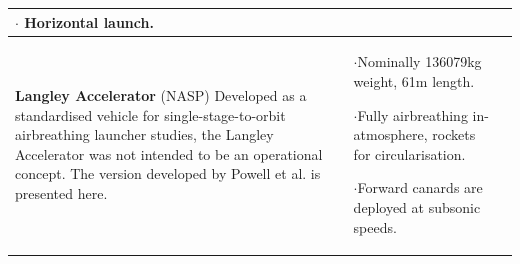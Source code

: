 \begin{xltabular}{\linewidth}{|X|X|X|}
$\cdot$ Horizontal launch.
\\
\hline\small \textbf{Langley Accelerator} (NASP)\cite{WCC,Powell1991,Lu1993} 
\newline  \newline Developed as a standardised vehicle for single-stage-to-orbit airbreathing launcher studies, the Langley Accelerator was not intended to be an operational concept. The version developed by Powell et al.\cite{Powell1991} is presented here. 
&
\small
{} 

$\cdot$Nominally 136079kg weight, 61m length.

$\cdot$Fully airbreathing in-atmosphere, rockets for circularisation.

$\cdot$Forward canards are deployed at subsonic speeds.

&
\small
{} 


\end{xltabular}
